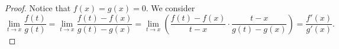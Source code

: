 \begin{Exercise}
\begin{proof}
Notice that $f(x) = g(x) = 0$.
We consider
$$
\lim_{t\to x}\frac{f(t)}{g(t)}
= \lim_{t\to x}\frac{f(t)-f(x)}{g(t)-g(x)}
= \lim_{t\to x}\left( \frac{f(t)-f(x)}{t-x} \cdot \frac{t-x}{g(t)-g(x)} \right)
= \frac{f'(x)}{g'(x)}.
$$
\end{proof}
\end{Exercise}
